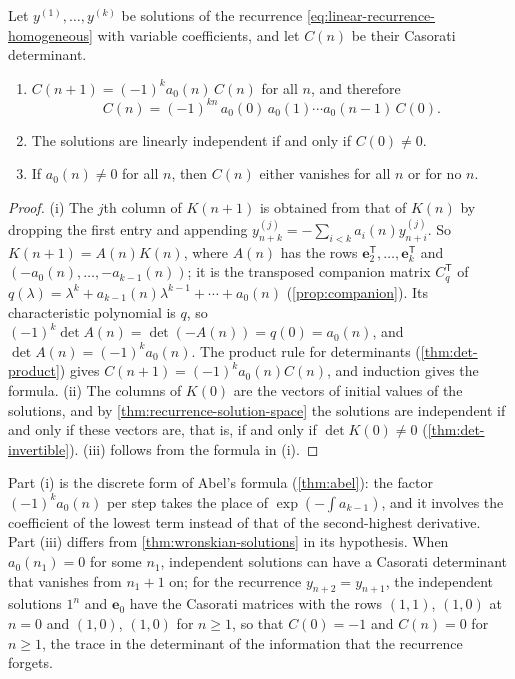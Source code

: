 \begin{theorem}
\label{thm:casorati}
Let $y^{(1)},\ldots,y^{(k)}$ be solutions of the recurrence \eqref{eq:linear-recurrence-homogeneous} with variable coefficients, and let $C(n)$ be their Casorati determinant.
\begin{enumerate}
\item $C(n+1)=(-1)^ka_0(n)\,C(n)$ for all $n$, and therefore
\[
C(n)=(-1)^{kn}\,a_0(0)\,a_0(1)\cdots a_0(n-1)\,C(0) .
\]
\item The solutions are linearly independent if and only if $C(0)\ne0$.
\item If $a_0(n)\ne0$ for all $n$, then $C(n)$ either vanishes for all $n$ or for no $n$.
\end{enumerate}
\end{theorem}

\begin{proof}
(i) The $j$th column of $K(n+1)$ is obtained from that of $K(n)$ by dropping the first entry and appending $y^{(j)}_{n+k}=-\sum_{i<k}a_i(n)y^{(j)}_{n+i}$. So $K(n+1)=A(n)K(n)$, where $A(n)$ has the rows $\mathbf e_2^{\mathsf T},\ldots,\mathbf e_k^{\mathsf T}$ and $(-a_0(n),\ldots,-a_{k-1}(n))$; it is the transposed companion matrix $C_q^{\mathsf T}$ of $q(\lambda)=\lambda^k+a_{k-1}(n)\lambda^{k-1}+\cdots+a_0(n)$ (\cref{prop:companion}). Its characteristic polynomial is $q$, so $(-1)^k\det A(n)=\det(-A(n))=q(0)=a_0(n)$, and $\det A(n)=(-1)^ka_0(n)$. The product rule for determinants (\cref{thm:det-product}) gives $C(n+1)=(-1)^ka_0(n)C(n)$, and induction gives the formula. (ii) The columns of $K(0)$ are the vectors of initial values of the solutions, and by \cref{thm:recurrence-solution-space} the solutions are independent if and only if these vectors are, that is, if and only if $\det K(0)\ne0$ (\cref{thm:det-invertible}). (iii) follows from the formula in (i).
\end{proof}

Part (i) is the discrete form of Abel's formula (\cref{thm:abel}): the factor $(-1)^ka_0(n)$ per step takes the place of $\exp(-\int a_{k-1})$, and it involves the coefficient of the lowest term instead of that of the second-highest derivative. Part (iii) differs from \cref{thm:wronskian-solutions} in its hypothesis. When $a_0(n_1)=0$ for some $n_1$, independent solutions can have a Casorati determinant that vanishes from $n_1+1$ on; for the recurrence $y_{n+2}=y_{n+1}$, the independent solutions $1^n$ and $\mathbf e_0$ have the Casorati matrices with the rows $(1,1)$, $(1,0)$ at $n=0$ and $(1,0)$, $(1,0)$ for $n\ge1$, so that $C(0)=-1$ and $C(n)=0$ for $n\ge1$, the trace in the determinant of the information that the recurrence forgets.

